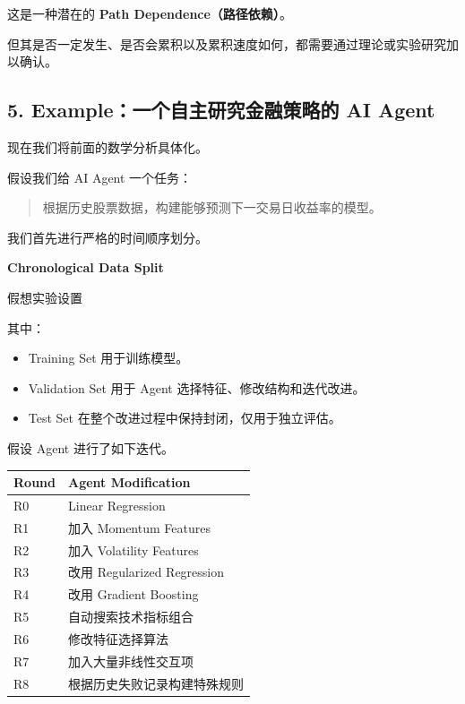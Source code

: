 这是一种潜在的 \textbf{Path Dependence（路径依赖）}。

但其是否一定发生、是否会累积以及累积速度如何，都需要通过理论或实验研究加以确认。

\hypertarget{part-1-03-0001-exampleux4e00ux4e2aux81eaux4e3bux7814ux7a76ux91d1ux878dux7b56ux7565ux7684-ai-agent}{%
\subsection{5. Example：一个自主研究金融策略的 AI Agent}\label{part-1-03-0001-exampleux4e00ux4e2aux81eaux4e3bux7814ux7a76ux91d1ux878dux7b56ux7565ux7684-ai-agent}}

现在我们将前面的数学分析具体化。

假设我们给 AI Agent 一个任务：

\begin{quote}
根据历史股票数据，构建能够预测下一交易日收益率的模型。
\end{quote}

我们首先进行严格的时间顺序划分。

\textbf{Chronological Data Split}

假想实验设置


其中：

\begin{itemize}
\tightlist
\item
  Training Set 用于训练模型。
\item
  Validation Set 用于 Agent 选择特征、修改结构和迭代改进。
\item
  Test Set 在整个改进过程中保持封闭，仅用于独立评估。
\end{itemize}

假设 Agent 进行了如下迭代。

\begin{readertable}
\begin{longtable}[]{@{}
  >{\raggedright\arraybackslash}p{}
  >{\raggedright\arraybackslash}p{}@{}}
\toprule
Round & Agent Modification \\
\midrule
\endhead
R0 & Linear Regression \\
R1 & 加入 Momentum Features \\
R2 & 加入 Volatility Features \\
R3 & 改用 Regularized Regression \\
R4 & 改用 Gradient Boosting \\
R5 & 自动搜索技术指标组合 \\
R6 & 修改特征选择算法 \\
R7 & 加入大量非线性交互项 \\
R8 & 根据历史失败记录构建特殊规则 \\
\bottomrule
\end{longtable}
\end{readertable}


